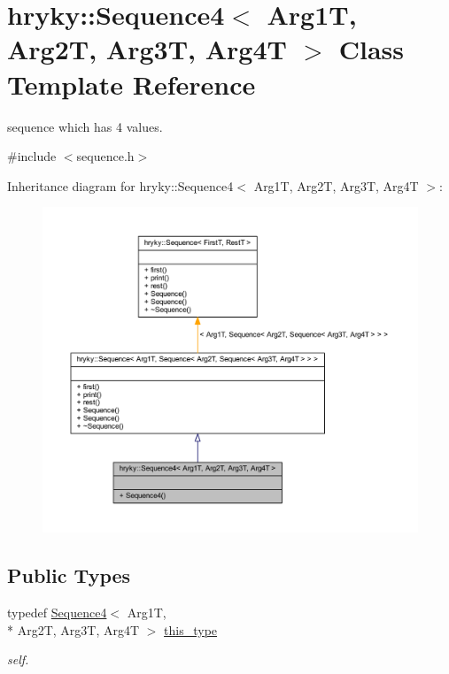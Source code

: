 \hypertarget{classhryky_1_1_sequence4}{\section{hryky\-:\-:Sequence4$<$ Arg1\-T, Arg2\-T, Arg3\-T, Arg4\-T $>$ Class Template Reference}
\label{classhryky_1_1_sequence4}
}


sequence which has 4 values.  




{\ttfamily \#include $<$sequence.\-h$>$}



Inheritance diagram for hryky\-:\-:Sequence4$<$ Arg1\-T, Arg2\-T, Arg3\-T, Arg4\-T $>$\-:\nopagebreak
\begin{figure}[H]
\begin{center}
\leavevmode
\includegraphics[width=350pt]{classhryky_1_1_sequence4__inherit__graph}
\end{center}
\end{figure}
\subsection*{Public Types}
\begin{DoxyCompactItemize}
\item 
\hypertarget{classhryky_1_1_sequence4_a6a1a7284ea57c3c45cf5ac0f64869897}{typedef \hyperlink{classhryky_1_1_sequence4}{Sequence4}$<$ Arg1\-T, \\*
Arg2\-T, Arg3\-T, Arg4\-T $>$ \hyperlink{classhryky_1_1_sequence4_a6a1a7284ea57c3c45cf5ac0f64869897}{this\-\_\-type}}\label{classhryky_1_1_sequence4_a6a1a7284ea57c3c45cf5ac0f64869897}

\begin{DoxyCompactList}\small\item\em self. \end{DoxyCompactList}\end{DoxyCompactItemize}
